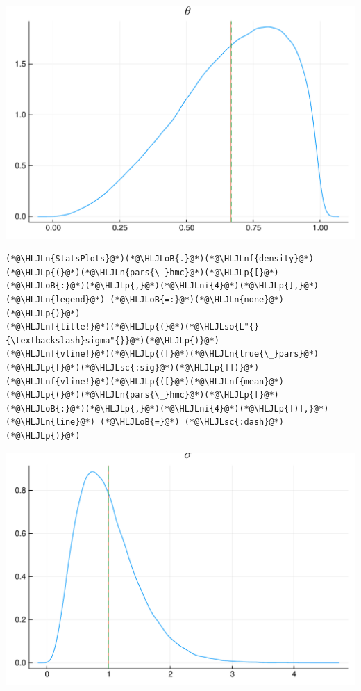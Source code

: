 \documentclass[12pt,a4paper]{article}
\newcommand{\HLJLn}[1]{#1}
\newcommand{\HLJLnf}[1]{\textcolor[RGB]{66,102,213}{#1}}
\newcommand{\HLJLsc}[1]{\textcolor[RGB]{201,61,57}{#1}}
\newcommand{\HLJLso}[1]{\textcolor[RGB]{201,61,57}{#1}}
\newcommand{\HLJLni}[1]{\textcolor[RGB]{59,151,46}{#1}}
\newcommand{\HLJLoB}[1]{\textcolor[RGB]{102,102,102}{\textbf{#1}}}
\newcommand{\HLJLp}[1]{#1}
\begin{document}
\includegraphics[width=\linewidth]{figures/dsge_and_julia_37_1.pdf}

\begin{lstlisting}
(*@\HLJLn{StatsPlots}@*)(*@\HLJLoB{.}@*)(*@\HLJLnf{density}@*)(*@\HLJLp{(}@*)(*@\HLJLn{pars{\_}hmc}@*)(*@\HLJLp{[}@*)(*@\HLJLoB{:}@*)(*@\HLJLp{,}@*)(*@\HLJLni{4}@*)(*@\HLJLp{],}@*) (*@\HLJLn{legend}@*) (*@\HLJLoB{=:}@*)(*@\HLJLn{none}@*)(*@\HLJLp{)}@*)
(*@\HLJLnf{title!}@*)(*@\HLJLp{(}@*)(*@\HLJLso{L"{}{\textbackslash}sigma"{}}@*)(*@\HLJLp{)}@*)
(*@\HLJLnf{vline!}@*)(*@\HLJLp{([}@*)(*@\HLJLn{true{\_}pars}@*)(*@\HLJLp{[}@*)(*@\HLJLsc{:sig}@*)(*@\HLJLp{]])}@*)
(*@\HLJLnf{vline!}@*)(*@\HLJLp{([}@*)(*@\HLJLnf{mean}@*)(*@\HLJLp{(}@*)(*@\HLJLn{pars{\_}hmc}@*)(*@\HLJLp{[}@*)(*@\HLJLoB{:}@*)(*@\HLJLp{,}@*)(*@\HLJLni{4}@*)(*@\HLJLp{])],}@*) (*@\HLJLn{line}@*) (*@\HLJLoB{=}@*) (*@\HLJLsc{:dash}@*)(*@\HLJLp{)}@*)
\end{lstlisting}

\includegraphics[width=\linewidth]{figures/dsge_and_julia_38_1.pdf}
\end{document}

